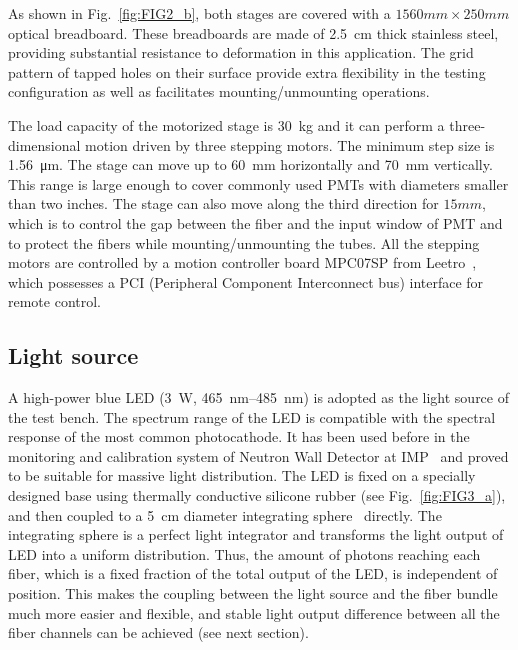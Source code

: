 \documentclass{nst}
\begin{document}
As shown in Fig.~\ref{fig:FIG2_b}, both stages are covered with a $1560mm\times250mm$ optical breadboard. 
These breadboards are made of \SI{2.5}{cm} thick stainless steel, providing substantial resistance to deformation in this application. 
The grid pattern of tapped holes on their surface provide extra flexibility in the testing configuration as well as facilitates mounting/unmounting operations.

The load capacity of the motorized stage is \SI{30}{\kilo\gram} and it can perform a three-dimensional motion driven by three stepping motors. The minimum step size is \SI{1.56}{\micro\meter}.
The stage can move up to \SI{60}{\milli\meter} horizontally and \SI{70}{\milli\meter} vertically. This range is large enough to cover commonly used PMTs with diameters smaller than two inches.
The stage can also move along the third direction for $15mm$, which is to control the gap between the fiber and the input window of PMT and to protect the fibers while mounting/unmounting the tubes.
All the stepping motors are controlled by a motion controller board MPC07SP from Leetro~\cite{leetro}, which possesses a PCI (Peripheral Component Interconnect bus) interface for remote control.

\subsection{Light source}
\label{sec:light_source}

A high-power blue LED (\SI{3}{\watt}, \SIrange{465}{485}{\nano\meter}) is adopted as the light source of the test bench.
The spectrum range of the LED is compatible with the spectral response of the most common photocathode.
It has been used before in the monitoring and calibration system of Neutron Wall Detector at IMP~\cite{yuyuhong_led} and proved to be suitable for massive light distribution.
The LED is fixed on a specially designed base using thermally conductive silicone rubber (see Fig.~\ref{fig:FIG3_a}), and then coupled to a \SI{5}{\centi\meter} diameter integrating sphere~\cite{integrating_sphere} directly.
The integrating sphere is a perfect light integrator and transforms the light output of LED into a uniform distribution.
Thus, the amount of photons reaching each fiber, which is a fixed fraction of the total output of the LED, is independent of position.
This makes the coupling between the light source and the fiber bundle much more easier and flexible, and stable light output difference between all the fiber channels can be achieved (see next section).
\end{document}
